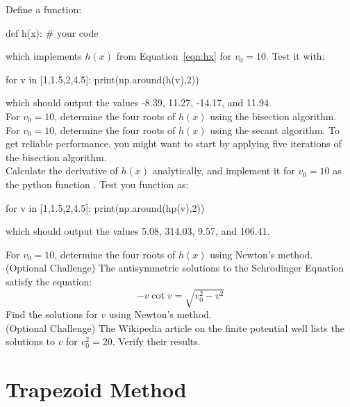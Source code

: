 \plot Define a function:
\begin{python}
def h(x):
   # your code   
\end{python}
which implements $h(x)$ from Equation~\ref{eqn:hx} for $v_0=10$.  Test it with:
\begin{python}
for v in [1,1.5,2,4.5]:
    print(np.around(h(v),2))
\end{python}
which should output the values -8.39, 11.27, -14.17, and 11.94.\\

\plot For $v_0=10$, determine the four roots of $h(x)$ using the bisection algorithm.\\

\plot For $v_0=10$, determine the four roots of $h(x)$ using the
secant algorithm.  To get reliable performance, you might want to
start by applying five iterations of the bisection algorithm.\\

\plot Calculate the derivative of $h(x)$ analytically, and implement it for $v_0=10$ as the python function . Test you function as:
\begin{python}
for v in [1,1.5,2,4.5]:
    print(np.around(hp(v),2))
\end{python}
which should output the values 5.08, 314.03, 9.57, and 106.41.

\plot For $v_0=10$, determine the four roots of $h(x)$ using Newton's method. \\

\plot (Optional Challenge) The antisymmetric solutions to the Schrodinger Equation satisfy the equation:
\begin{displaymath}
- v \cot v = \sqrt{v_0^2 - v^2}
\end{displaymath}
Find the solutions for $v$ using Newton's method.\\

\plot (Optional Challenge) The Wikipedia article on the finite potential well lists the solutions to $v$ for $v_0^2=20$.  Verify their results.

\section{Trapezoid Method}

